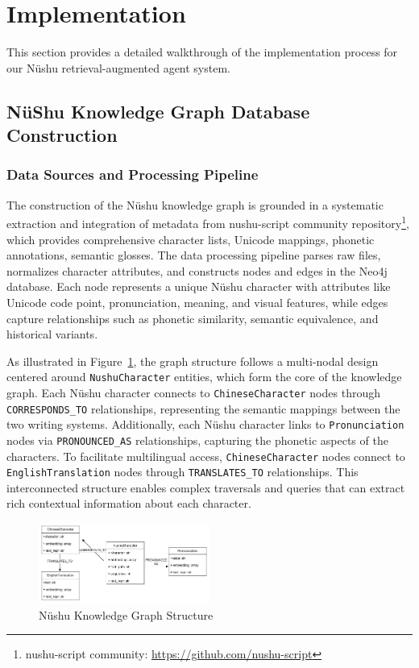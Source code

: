 \documentclass{article}
\begin{document}
\section{Implementation}
\label{sec:impl}
This section provides a detailed walkthrough of the implementation process for our N\"{u}shu retrieval-augmented agent system. 

\subsection{N\"{u}Shu Knowledge Graph Database Construction}
\label{ssec:kg_construction}

\subsubsection{Data Sources and Processing Pipeline}

The construction of the N\"{u}shu knowledge graph is grounded in a systematic extraction and integration of metadata from nushu-script community repository\footnote{nushu-script community: \url{https://github.com/nushu-script}}, which provides comprehensive character lists, Unicode mappings, phonetic annotations, semantic glosses. 
The data processing pipeline parses raw files, normalizes character attributes, and constructs nodes and edges in the Neo4j database. Each node represents a unique N\"{u}shu character with attributes like Unicode code point, pronunciation, meaning, and visual features, while edges capture relationships such as phonetic similarity, semantic equivalence, and historical variants.

As illustrated in Figure~\ref{fig:nvshu_kg_structure}, the graph structure follows a multi-nodal design centered around \texttt{NushuCharacter} entities, which form the core of the knowledge graph. 
Each N\"{u}shu character connects to \texttt{ChineseCharacter} nodes through \texttt{CORRESPONDS\_TO} relationships, representing the semantic mappings between the two writing systems. 
Additionally, each N\"{u}shu character links to \texttt{Pronunciation} nodes via \texttt{PRONOUNCED\_AS} relationships, capturing the phonetic aspects of the characters. 
To facilitate multilingual access, \texttt{ChineseCharacter} nodes connect to \texttt{EnglishTranslation} nodes through \texttt{TRANSLATES\_TO} relationships. 
This interconnected structure enables complex traversals and queries that can extract rich contextual information about each character.
\begin{figure}[htb]
\centering
\includegraphics[width=0.5\textwidth]{images/nvshu.drawio.pdf}
\caption{N\"{u}shu Knowledge Graph Structure}
\label{fig:nvshu_kg_structure}
\end{figure}
\end{document}
